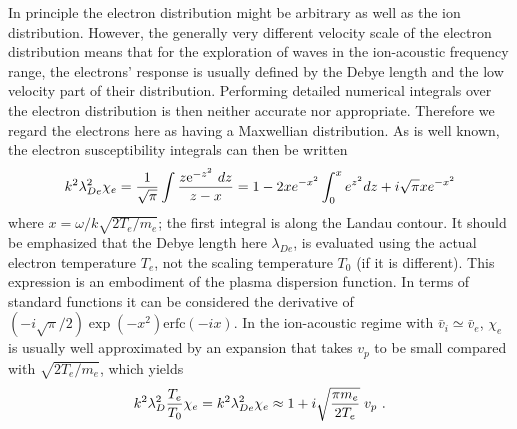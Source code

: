 \documentclass[12pt]{article}
\begin{document}
In principle the electron distribution might be arbitrary as well as
the ion distribution. However, the generally very different velocity
scale of the electron distribution means that for the exploration of
waves in the ion-acoustic frequency range, the electrons' response is
usually defined by the Debye length and the low velocity part of their
distribution. Performing detailed numerical integrals over the
electron distribution is then neither accurate nor appropriate. Therefore
we regard the electrons here as having a Maxwellian distribution. As
is well known, the electron susceptibility integrals can then be
written
\begin{equation}\label{chiefull}
   k^2\lambda_{De}^2 \chi_e = {1\over \sqrt{\pi}} \int {z {\rm
       e}^{-z^2} \ dz\over z-x} =
1 -2xe^{-x^2}\int_0^x e^{z^2}dz + i\sqrt{\pi} x e^{-x^2}
\end{equation}
where $x=\omega/k\sqrt{2T_e/m_e}$; the first integral is along the
Landau contour. It should be emphasized that the Debye length here
$\lambda_{De}$, is evaluated using the actual electron temperature
$T_e$, not the scaling temperature $T_0$ (if it is different). This
expression is an embodiment of the plasma dispersion function. In
terms of standard functions it can be considered the derivative of
$(-i\sqrt{\pi}/2)\exp(-x^2)\mbox{erfc}(-ix)$. In the ion-acoustic
regime with $\bar v_i\simeq \bar v_e$, $\chi_e$ is usually well approximated
by an expansion that takes $v_p$ to be small compared with
$\sqrt{2T_e/m_e}$, which yields
\begin{equation}\label{chie}
   k^2\lambda_{D}^2 {T_e\over T_0} \chi_e=
k^2\lambda_{De}^2 \chi_e \approx 1 + i \sqrt{\pi m_e\over 2 T_e}\; v_p\ .
\end{equation}
\end{document}
